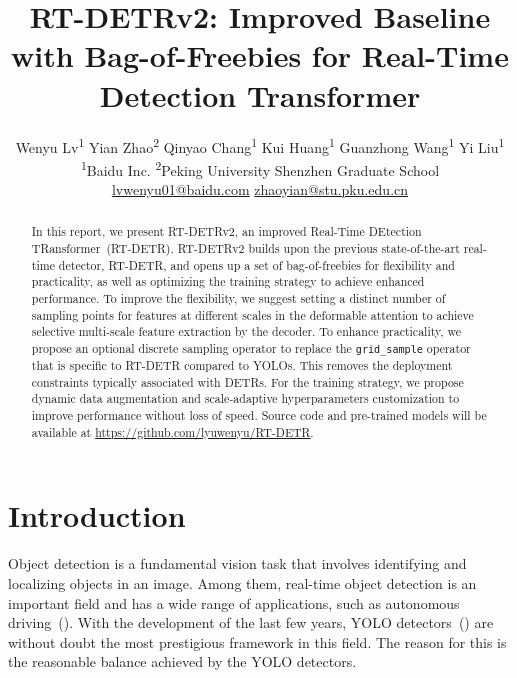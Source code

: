 \documentclass{article}
\title{RT-DETRv2: Improved Baseline with Bag-of-Freebies for Real-Time Detection Transformer}
\author{
\vspace{1mm}
Wenyu Lv\textsuperscript{1} \quad Yian Zhao\textsuperscript{2} \quad
Qinyao Chang\textsuperscript{1} \quad Kui Huang\textsuperscript{1} \quad Guanzhong Wang\textsuperscript{1} \quad Yi Liu\textsuperscript{1} \\
\vspace{1mm}
\small\textsuperscript{1}Baidu Inc. \quad 
\small\textsuperscript{2}Peking University Shenzhen Graduate School\\
\small \href{mailto:lvwenyu01@baidu.com}{lvwenyu01@baidu.com} \quad
\small \href{mailto:zhaoyian@stu.pku.edu.cn}{zhaoyian@stu.pku.edu.cn}  
}
\begin{document}
\maketitle

\begin{abstract}
In this report, we present RT-DETRv2, an improved Real-Time DEtection TRansformer~(RT-DETR).
RT-DETRv2 builds upon the previous state-of-the-art real-time detector, RT-DETR, and opens up a set of bag-of-freebies for flexibility and practicality, as well as optimizing the training strategy to achieve enhanced performance.
To improve the flexibility, we suggest setting a distinct number of sampling points for features at different scales in the deformable attention to achieve selective multi-scale feature extraction by the decoder.
To enhance practicality, we propose an optional discrete sampling operator to replace the \texttt{grid\_sample} operator that is specific to RT-DETR compared to YOLOs. This removes the deployment constraints typically associated with DETRs.
For the training strategy, we propose dynamic data augmentation and scale-adaptive hyperparameters customization to improve performance without loss of speed.
Source code and pre-trained models will be available at \href{https://github.com/lyuwenyu/RT-DETR}{https://github.com/lyuwenyu/RT-DETR}.
\end{abstract}

\section{Introduction}
Object detection is a fundamental vision task that involves identifying and localizing objects in an image.
Among them, real-time object detection is an important field and has a wide range of applications, such as autonomous driving~(\cite{atakishiyev2024explainable}).
With the development of the last few years, YOLO detectors~(\cite{redmon2017yolo9000,redmon2018yolov3,bochkovskiy2020yolov4,yolov5v7.0,xu2022pp,li2023yolov6v3,wang2023yolov7,yolov8,wang2024yolov9,wang2024yolov10}) are without doubt the most prestigious framework in this field.
The reason for this is the reasonable balance achieved by the YOLO detectors.
\end{document}
